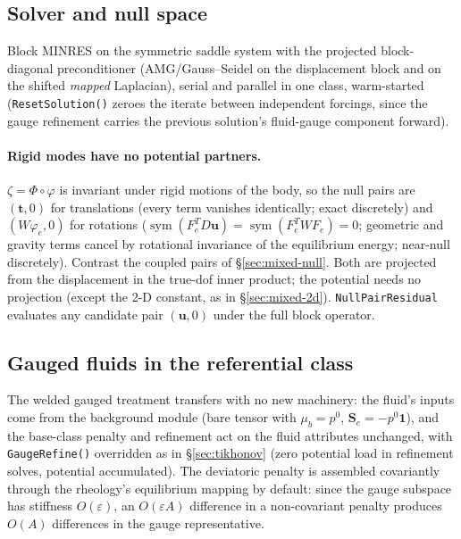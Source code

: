 \documentclass[11pt]{article}
\numberwithin{equation}{section}
\theoremstyle{remark}
\newcommand{\eps}{\varepsilon}
\newcommand{\sym}{\operatorname{sym}}
\newcommand{\vu}{\mathbf{u}}
\newcommand{\vt}{\mathbf{t}}
\newcommand{\Se}{\mathbf{S}_e}
\newcommand{\code}[1]{\texttt{#1}}
\begin{document}
\subsection{Solver and null space}

Block MINRES on the symmetric saddle system with the projected
block-diagonal preconditioner (AMG/Gauss--Seidel on the displacement block
and on the shifted \emph{mapped} Laplacian), serial and parallel in one
class, warm-started (\code{ResetSolution()} zeroes the iterate between
independent forcings, since the gauge refinement carries the previous
solution's fluid-gauge component forward).

\paragraph{Rigid modes have no potential partners.} $\zeta = \Phi\circ
\varphi$ is invariant under rigid motions of the body, so the null pairs are
$(\vt,0)$ for translations (every term vanishes identically; exact
discretely) and $(W\varphi_e,0)$ for rotations ($\sym(F_e^TD\vu) =
\sym(F_e^TWF_e) = 0$; geometric and gravity terms cancel by rotational
invariance of the equilibrium energy; near-null discretely). Contrast the
coupled pairs of \S\ref{sec:mixed-null}. Both are projected from the
displacement in the true-dof inner product; the potential needs no
projection (except the 2-D constant, as in \S\ref{sec:mixed-2d}).
\code{NullPairResidual} evaluates any candidate pair $(\vu,0)$ under the
full block operator.

\subsection{Gauged fluids in the referential class}
\label{sec:ref-gauged}

The welded gauged treatment transfers with no new machinery: the fluid's
inputs come from the background module (bare tensor with $\mu_b = p^0$,
$\Se = -p^0\mathbf{1}$), and the base-class penalty and refinement act on
the fluid attributes unchanged, with \code{GaugeRefine()} overridden as in
\S\ref{sec:tikhonov} (zero potential load in refinement solves, potential
accumulated). The deviatoric penalty is assembled covariantly through the
rheology's equilibrium mapping by default: since the gauge subspace has
stiffness $O(\eps)$, an $O(\eps A)$ difference in a non-covariant penalty
produces $O(A)$ differences in the gauge representative.
\end{document}
